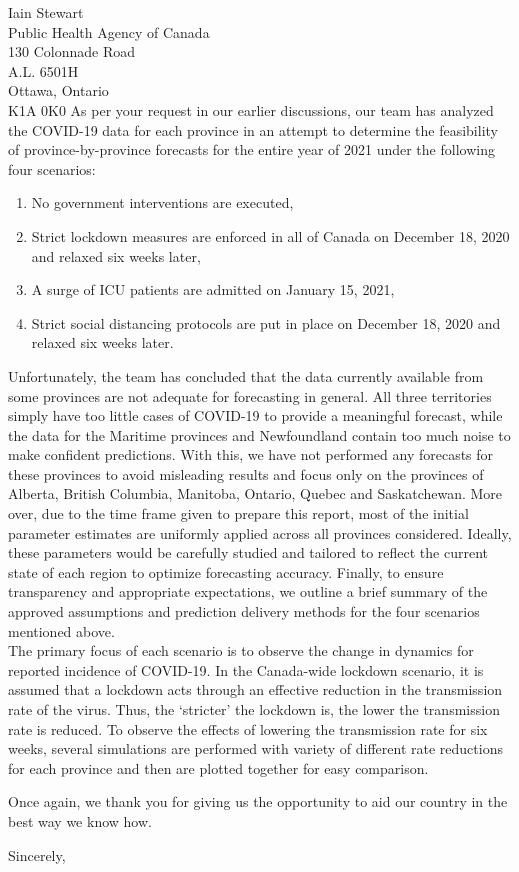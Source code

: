\documentclass[12pt]{letter}
\begin{document}
\begin{letter}{
Iain Stewart\\
Public Health Agency of Canada\\
130 Colonnade Road\\
A.L. 6501H\\
Ottawa, Ontario\\
K1A 0K0}
As per your request in our earlier discussions, our team has analyzed the COVID-19 data for each province in an attempt to determine the feasibility of province-by-province forecasts for the entire year of 2021 under the following four scenarios:
\begin{enumerate}
\item No government interventions are executed,
\item Strict lockdown measures are enforced in all of Canada on December 18, 2020 and relaxed six weeks later,
\item A surge of ICU patients are admitted on January 15, 2021,
\item Strict social distancing protocols are put in place on December 18, 2020 and relaxed six weeks later.
\end{enumerate}
Unfortunately,  the team has concluded that the data currently available from some provinces are not adequate for forecasting in general. All three territories simply have too little cases of COVID-19 to provide a meaningful forecast, while the data for the Maritime provinces and Newfoundland contain too much noise to make confident predictions. With this, we have not performed any forecasts for these provinces to avoid misleading results and focus only on the provinces of Alberta, British Columbia, Manitoba, Ontario, Quebec and Saskatchewan. More over, due to the time frame given to prepare this report, most of the initial parameter estimates are uniformly applied across all provinces considered. Ideally, these parameters would be carefully studied and tailored to reflect the current state of each region to optimize forecasting accuracy. Finally, to ensure transparency and appropriate expectations, we outline a brief summary of the approved assumptions and prediction delivery methods for the four scenarios mentioned above.\\

The primary focus of each scenario is to observe the change in dynamics for reported incidence of COVID-19. In the Canada-wide lockdown scenario, it is assumed that a lockdown acts through an effective reduction in the transmission rate of the virus. Thus, the `stricter' the lockdown is, the lower the transmission rate is reduced. To observe the effects of lowering the transmission rate for six weeks,  several simulations are performed with variety of different rate reductions for each province and then are plotted together for easy comparison.  


Once again, we thank you for giving us the opportunity to aid our country in the best way we know how.

\closing{Sincerely,} 
 

 

\end{letter}
 
\end{document}
